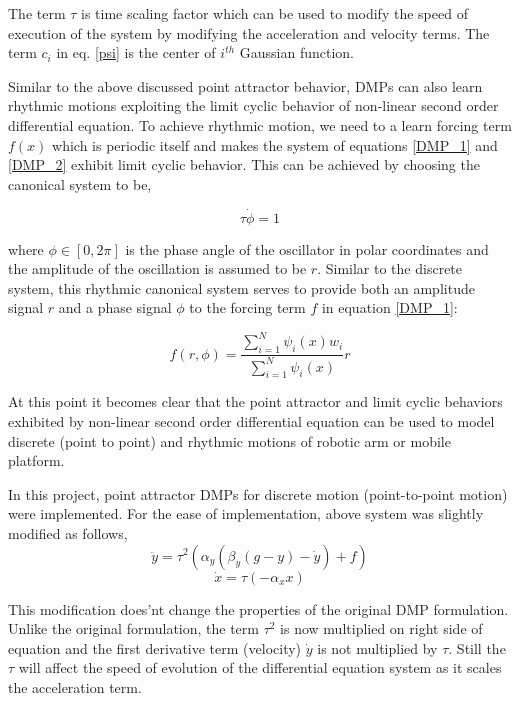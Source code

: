The term $\tau$ is time scaling factor which can be used to modify the speed of execution of the system by modifying the acceleration and velocity terms. The term $c_i$ in eq. \ref{psi} is the center of $i^{th}$ Gaussian function.    

Similar to the above discussed point attractor behavior, DMPs can also learn rhythmic motions exploiting the limit cyclic behavior of non-linear second order differential equation. To achieve rhythmic motion, we need to a learn forcing term $f(x)$ which is periodic itself and makes the system of equations \ref{DMP_1} and \ref{DMP_2} exhibit limit cyclic behavior. This can be achieved by choosing the canonical system to be,

\begin{equation}
	\tau \dot{\phi} = 1
\end{equation}  

where $\phi \in [0, 2\pi]$ is the phase angle of the oscillator in polar coordinates and the amplitude of the oscillation is assumed to be $r$. Similar to the discrete system, this rhythmic canonical system serves to provide both an amplitude signal $r$ and a phase signal $\phi$ to the forcing term $f$ in equation \ref{DMP_1}:

\begin{equation}
	f(r, \phi) = \frac{\sum_{i=1}^{N}\psi_{i}(x)w_{i}}{\sum_{i=1}^{N}\psi_{i}(x)}r
\end{equation}

\par At this point it becomes clear that the point attractor and limit cyclic behaviors exhibited by non-linear second order differential equation can be used to model discrete (point to point) and rhythmic motions of robotic arm or mobile platform.   
\vspace{0.5cm}

In this project, point attractor DMPs for discrete motion (point-to-point motion) were implemented. For the ease of implementation, above system was slightly modified as follows, 
\begin{equation}\label{actual_DMP}
	\ddot{y} = \tau^{2}(\alpha_{y}(\beta_{y}(g-y)-\dot{y}) + f)
\end{equation}
\begin{equation}
	\dot{x} = \tau(-\alpha_{x}x)
\end{equation}

This modification does'nt change the properties of the original DMP formulation. Unlike the original formulation, the term $\tau^2$ is now multiplied on right side of equation and the first derivative term (velocity) $\dot{y}$ is not multiplied by $\tau$. Still the $\tau$ will affect the speed of evolution of the differential equation system as it scales the acceleration term. 

